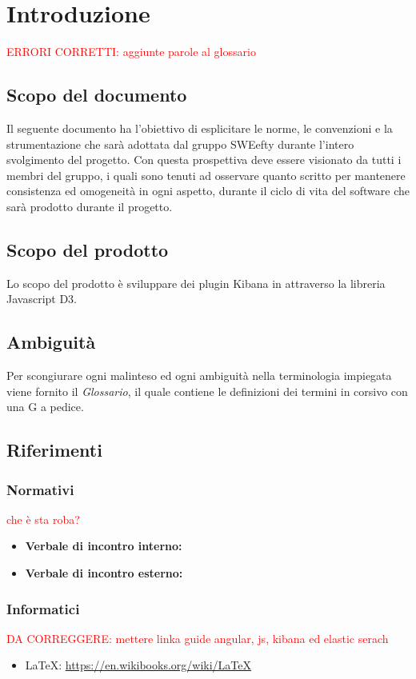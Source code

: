 \section{Introduzione}
\textcolor{red}{ERRORI CORRETTI: aggiunte parole al glossario}
\subsection{Scopo del documento}
Il seguente documento ha l'obiettivo di esplicitare le norme, le convenzioni e la strumentazione che sarà adottata dal gruppo SWEefty durante l'intero svolgimento del progetto. Con questa prospettiva deve essere visionato da tutti i membri del gruppo, i quali sono tenuti ad osservare quanto scritto per mantenere consistenza ed omogeneità in ogni aspetto, durante il ciclo di vita del software che sarà prodotto durante il progetto.
\subsection{Scopo del prodotto}
Lo scopo del prodotto è sviluppare dei plugin Kibana in attraverso la libreria Javascript D3.

\subsection{Ambiguità}
Per scongiurare ogni malinteso ed ogni ambiguità nella terminologia impiegata viene fornito il \textit{Glossario}, il quale contiene le definizioni dei termini in corsivo con una G a pedice.

\subsection{Riferimenti}
	\subsubsection{Normativi}
	\textcolor{red}{che è sta roba?}
		\begin{itemize}
			\item \textbf{Verbale di incontro interno:}
			\item \textbf{Verbale di incontro esterno:}		
		\end{itemize}
	\subsubsection{Informatici}
	\textcolor{red}{DA CORREGGERE: mettere linka  guide angular, js, kibana ed elastic serach}
	\begin{itemize}
		\item \LaTeX:  \href{https://en.wikibooks.org/wiki/LaTeX}{https://en.wikibooks.org/wiki/LaTeX}
	\end{itemize}
	